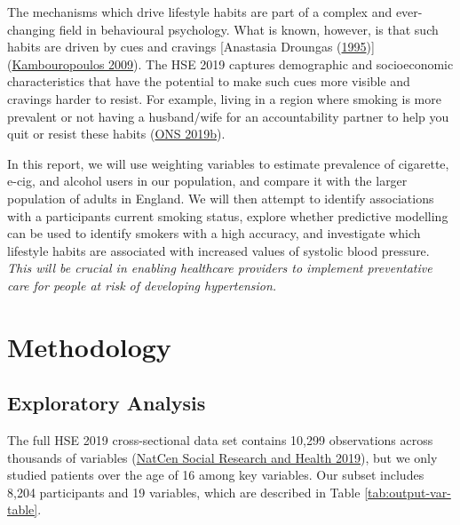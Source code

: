 \documentclass[
  11pt,
  twocolumn]{article}
\begin{document}
The mechanisms which drive lifestyle habits are part of a complex and
ever-changing field in behavioural psychology. What is known, however,
is that such habits are driven by cues and cravings {[}Anastasia
Droungas
(\protect\hyperlink{ref-SmokeCue}{1995}){]}(\protect\hyperlink{ref-DrinkCue}{Kambouropoulos
2009}). The HSE 2019 captures demographic and socioeconomic
characteristics that have the potential to make such cues more visible
and cravings harder to resist. For example, living in a region where
smoking is more prevalent or not having a husband/wife for an
accountability partner to help you quit or resist these habits
(\protect\hyperlink{ref-AccountPartner}{ONS 2019b}).

In this report, we will use weighting variables to estimate prevalence
of cigarette, e-cig, and alcohol users in our population, and compare it
with the larger population of adults in England. We will then attempt to
identify associations with a participants current smoking status,
explore whether predictive modelling can be used to identify smokers
with a high accuracy, and investigate which lifestyle habits are
associated with increased values of systolic blood pressure. \emph{This
will be crucial in enabling healthcare providers to implement
preventative care for people at risk of developing hypertension.}

\hypertarget{methodology}{%
\section{Methodology}\label{methodology}}

\hypertarget{exploratory-analysis}{%
\subsection{Exploratory Analysis}\label{exploratory-analysis}}

The full HSE 2019 cross-sectional data set contains 10,299 observations
across thousands of variables (\protect\hyperlink{ref-Main}{NatCen
Social Research and Health 2019}), but we only studied patients over the
age of 16 among key variables. Our subset includes 8,204 participants
and 19 variables, which are described in Table
\ref{tab:output-var-table}.
\end{document}
